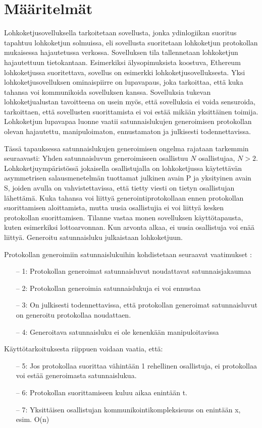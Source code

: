 \chapter{Määritelmät\label{methods}}

Lohkoketjusovelluksella tarkoitetaan sovellusta, jonka ydinlogiikan suoritus tapahtuu lohkoketjun solmuissa, eli sovellusta suoritetaan lohkoketjun protokollan mukaisessa hajautetussa verkossa. Sovelluksen tila tallennetaan lohkoketjun hajautettuun tietokantaan. Esimerkiksi älysopimuksista koostuva, Ethereum\cite{ethereum_foundation_ethereum_nodate}
 lohkoketjussa suoritettava, sovellus on esimerkki lohkoketjusovelluksesta. Yksi lohkoketjusovelluksen ominaispiirre on lupavapaus, joka tarkoittaa, että kuka tahansa voi kommunikoida sovelluksen kanssa. Sovelluksia tukevan lohkoketjualustan tavoitteena on usein myös, että sovelluksia ei voida sensuroida, tarkoittaen, että sovellusten suorittamista ei voi estää mikään yksittäinen toimija.
Lohkoketjun lupavapaa luonne vaatii satunnaislukujen generoimisen protokollan olevan hajautettu, manipuloimaton, ennustamaton ja julkisesti todennettavissa.

Tässä tapauksessa satunnaislukujen generoimisen ongelma rajataan tarkemmin seuraavasti:
Yhden satunnaisluvun generoimiseen osallistuu $N$ osallistujaa,  $N > 2$. Lohkoketjuympäristössä jokaisella osallistujalla on lohkoketjussa käytettävän asymmetrisen salausmenetelmän tuottamat julkinen avain P ja yksityinen avain S, joiden avulla on vahvistettavissa, että tietty viesti on tietyn osallistujan lähettämä. Kuka tahansa voi liittyä generointiprotokollaan ennen protokollan suorittamisen aloittamista, mutta uusia osallistujia ei voi liittyä kesken protokollan suorittamisen. Tilanne vastaa monen sovelluksen käyttötapausta, kuten esimerkiksi lottoarvonnan. Kun arvonta alkaa, ei uusia osallistuja voi enää liittyä. Generoitu satunnaisluku julkaistaan lohkoketjuun. 

Protokollan generoimiin satunnaislukuihin kohdistetaan seuraavat vaatimukset \cite{simic_review_2020}:
\begin{itemize}
    \item[--] 1: Protokollan generoimat satunnaisluvut noudattavat satunnaisjakaumaa
    \item[--] 2: Protokollan generoimia satunnaislukuja ei voi ennustaa
    \item[--] 3: On julkisesti todennettavissa, että protokollan generoimat satunnaisluvut on generoitu protokollaa noudattaen.
    \item[--] 4: Generoitava satunnaisluku ei ole kenenkään manipuloitavissa
\end{itemize}\textbf{}
Käyttötarkoituksesta riippuen voidaan vaatia, että:

\begin{itemize}
    \item[--] 5: Jos protokollaa suorittaa vähintään 1 rehellinen osallistuja, ei protokollaa voi estää generoimasta satunnaislukua.
    \item[--] 6: Protokollan suorittamiseen kuluu aikaa enintään t.
    \item[--] 7: Yksittäisen osallistujan kommunikointikompleksisuus on enintään x, esim. O(n)
\end{itemize}